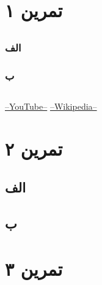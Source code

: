 \documentclass[]{article}
\begin{document}
\section*{تمرین ۱}

\subsection*{\color{blue}{جواب}}
\subsubsection*{الف}

\subsubsection*{ب}


\subsection*{\color{red}{مراجع}}
\begin{latin}
\href{https://www.youtube.com/watch?v=TXkDpqjDMHA}{--YouTube--} \hspace{0.2cm}
\href{https://en.wikipedia.org/wiki/Zero-weight_cycle_problem}{--Wikipedia--}
\end{latin}

\pagebreak
\section*{تمرین ۲}

\subsection*{\color{blue}{جواب}}
\subsection*{الف}

\subsection*{ب}


\pagebreak
\section*{تمرین ۳}

\end{document}
